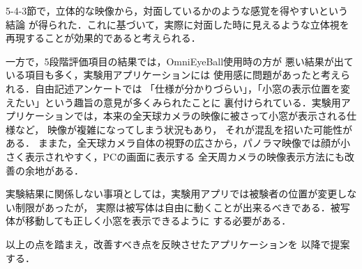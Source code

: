 \begin{comment}
・また，SUSのネガティブな評価項目がOEB使用時で有意差は見られないものも，5に近くなってしまっている．

・OEB使用時のアンケート結果でGUIに関する意見が多く出ている．

・特に「仕様が分かりづらい」，「小窓の表示位置を変えたい」という趣旨の意見が多くみられた．

・小窓の位置のみならず，本来の全天球カメラの映像に被さって小窓が表示される仕様など，映像が複雑になってしまう状況もあり，
それが混乱を招いた可能性がある．

・また，全天球カメラ自体の視野の広さから，パノラマ映像では顔が小さく表示されやすく，PCの画面に表示する
全天周カメラの映像表示方法にも改善の余地がある．

・算出した偽陽性率に改善が見られなかった点から，小窓に表示する顔の表示方法自体も変更する余地がある．

・実験結果に関係しない事項としては，実験用アプリでは被験者の位置が変更しない制限があったが，
実際は被写体は自由に動くことが出来るべきである．被写体が移動しても正しく小窓を表示できるように
する必要がある．
\end{comment}
5-4-3節で，立体的な映像から，対面しているかのような感覚を得やすいという結論
が得られた．これに基づいて，実際に対面した時に見えるような立体視を
再現することが効果的であると考えられる．

一方で，5段階評価項目の結果では，OmniEyeBall使用時の方が
悪い結果が出ている項目も多く，実験用アプリケーションには
使用感に問題があったと考えられる．自由記述アンケートでは
「仕様が分かりづらい」，「小窓の表示位置を変えたい」という趣旨の意見が多くみられたことに
裏付けられている．実験用アプリケーションでは，本来の全天球カメラの映像に被さって小窓が表示される仕様など，
映像が複雑になってしまう状況もあり，
それが混乱を招いた可能性がある．
ままた，全天球カメラ自体の視野の広さから，パノラマ映像では顔が小さく表示されやすく，PCの画面に表示する
全天周カメラの映像表示方法にも改善の余地がある．

実験結果に関係しない事項としては，実験用アプリでは被験者の位置が変更しない制限があったが，
実際は被写体は自由に動くことが出来るべきである．被写体が移動しても正しく小窓を表示できるように
する必要がある．

以上の点を踏まえ，改善すべき点を反映させたアプリケーションを
以降で提案する．